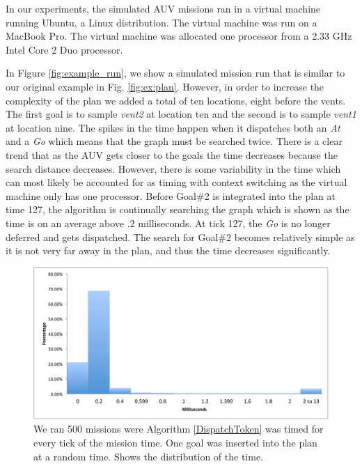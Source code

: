 In our experiments, the simulated AUV missions ran in a virtual machine running Ubuntu, a Linux distribution. The virtual machine
was run on a MacBook Pro. The virtual machine was allocated one processor from a 2.33 GHz Intel Core 2 Duo processor. 

In Figure \ref{fig:example_run}, we show a simulated mission run that is similar to our original example in Fig. \ref{fig:ex:plan}.
However, in order to increase the complexity of the plan we added a total of ten locations, eight before the vents. The first goal 
is to sample {\em vent2} at location ten and the second is to sample {\em vent1} at location nine. The spikes in the time 
happen when it dispatches both an {\em At} and a {\em Go} which means that the graph must be searched twice. There
is a clear trend that as the AUV gets closer to the goals the time decreases because the search distance decreases. 
However, there is some variability in the time which can most likely be accounted for as timing with context switching as the virtual
machine only has one processor. Before Goal\#2 is integrated into the plan at time 127, the algorithm is continually
searching the graph which is shown as the time is on an average above .2 milliseconds. At tick 127, the {\em Go} is no longer 
deferred and gets dispatched. The search for Goal\#2 becomes relatively simple as it is not very far away in the plan, and thus the
time decreases significantly.

\begin{figure}
\centering
\includegraphics[width=\columnwidth]{figs/HistogramAlg1}
\caption{\small  We ran 500 missions were Algorithm \ref{DispatchToken} was timed for every tick of the mission time.
One goal was inserted into the plan at a random time. Shows the distribution of the time.} 
  \label{fig:histogram}
\end{figure}

